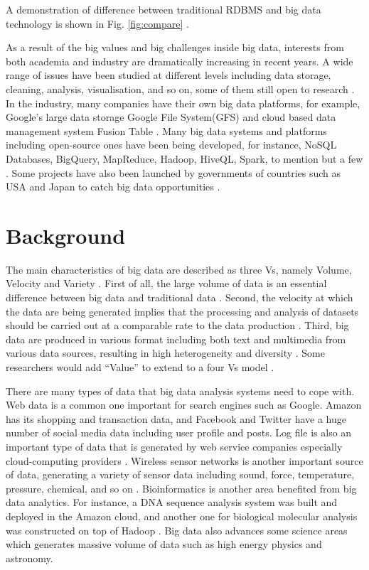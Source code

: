 \documentclass[conference]{IEEEtran}
\begin{document}
A demonstration of difference between traditional RDBMS and big data
technology is shown in Fig. \ref{fig:compare} .

As a result of the big values and big challenges inside big data,
interests from both academia and industry are dramatically increasing in
recent years. A wide range of issues have been studied at different
levels including data storage, cleaning, analysis, visualisation, and so
on, some of them still open to research \autocite{OUSSOUS2018431}. In
the industry, many companies have their own big data platforms, for
example, Google's large data storage Google File System(GFS) and cloud
based data management system Fusion Table \autocite{Hewage2018}. Many
big data systems and platforms including open-source ones have been
being developed, for instance, NoSQL Databases, BigQuery, MapReduce,
Hadoop, HiveQL, Spark, to mention but a few
\autocite{Hewage2018,SIVARAJAH2017,hu2014}. Some projects have also been
launched by governments of countries such as USA and Japan to catch big
data opportunities \autocite{OUSSOUS2018431}.

\hypertarget{background}{%
\section{Background}\label{background}}

The main characteristics of big data are described as three Vs, namely
Volume, Velocity and Variety \autocite{OUSSOUS2018431,hu2014}. First of
all, the large volume of data is an essential difference between big
data and traditional data \autocite{hu2014}. Second, the velocity at
which the data are being generated implies that the processing and
analysis of datasets should be carried out at a comparable rate to the
data production \autocite{hu2014}. Third, big data are produced in
various format including both text and multimedia from various data
sources, resulting in high heterogeneity and diversity
\autocite{OUSSOUS2018431,Pouyanfar2018}. Some researchers would add
``Value'' to extend to a four Vs model \autocite{hashem_rise_2015}.

There are many types of data that big data analysis systems need to cope
with. Web data is a common one important for search engines such as
Google. Amazon has its shopping and transaction data, and Facebook and
Twitter have a huge number of social media data including user profile
and posts. Log file is also an important type of data that is generated
by web service companies especially cloud-computing providers
\autocite{hu2014}. Wireless sensor networks is another important source
of data, generating a variety of sensor data including sound, force,
temperature, pressure, chemical, and so on \autocite{hu2014}.
Bioinformatics is another area benefited from big data analytics. For
instance, a DNA sequence analysis system was built and deployed in the
Amazon cloud, and another one for biological molecular analysis was
constructed on top of Hadoop \autocite{hashem_rise_2015}. Big data also
advances some science areas which generates massive volume of data such
as high energy physics and astronomy.
\end{document}
